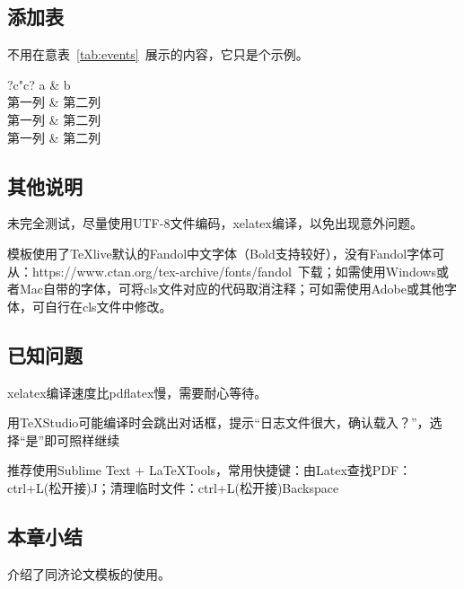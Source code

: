 \subsection{添加表}

不用在意表~\ref{tab:events}~展示的内容，它只是个示例。

\begin{table}[htb!]
  	\centering
  	\caption{Add caption}
  	\label{tab:events}
    \begin{tabular}{?c"c?}
	    \thickhline
	    a     & b \bigstrut\\
	    \thinhline
		第一列   & 第二列 \bigstrut\\
	    \thinhline
	    第一列   & 第二列 \bigstrut\\
	    \thinhline
	    第一列   & 第二列 \bigstrut\\
	    \thickhline
    \end{tabular}%
  \label{tab:addlabel}
\end{table}

\subsection{其他说明}

未完全测试，尽量使用UTF-8文件编码，xelatex编译，以免出现意外问题。

模板使用了TeXlive默认的Fandol中文字体（Bold支持较好），没有Fandol字体可从：https://www.ctan.org/tex-archive/fonts/fandol~下载；如需使用Windows或者Mac自带的字体，可将cls文件对应的代码取消注释；可如需使用Adobe或其他字体，可自行在cls文件中修改。

\subsection{已知问题}

xelatex编译速度比pdflatex慢，需要耐心等待。

用TeXStudio可能编译时会跳出对话框，提示“日志文件很大，确认载入？”，选择“是”即可照样继续

推荐使用Sublime Text + LaTeXTools，常用快捷键：由Latex查找PDF：ctrl+L(松开接)J；清理临时文件：ctrl+L(松开接)Backspace

\subsection{本章小结}

介绍了同济论文模板的使用。